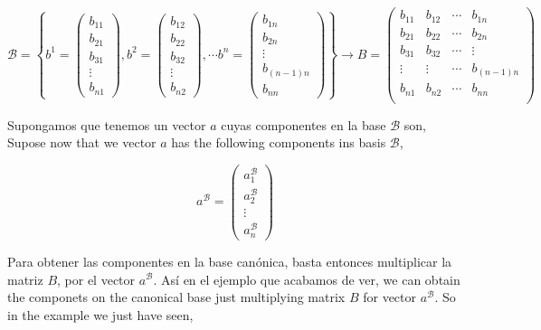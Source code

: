 \begin{equation*}
\mathcal{B}=\left\lbrace b^1=\begin{pmatrix}
b_{11}\\
b_{21}\\
b_{31}\\
\vdots \\
b_{n1}
\end{pmatrix},b^2=\begin{pmatrix}
b_{12}\\
b_{22}\\
b_{32}\\
\vdots \\
b_{n2}
\end{pmatrix},
\cdots
b^n=\begin{pmatrix}
b_{1n}\\
b_{2n}\\
\vdots \\
b_{(n-1)n}\\
b_{nn}
\end{pmatrix} \right\rbrace \rightarrow
B=\begin{pmatrix}
b_{11}&b_{12}& \cdots & b_{1n}\\
b_{21}&b_{22}& \cdots & b_{2n}\\
b_{31}&b_{32}& \cdots & \vdots \\
\vdots & \vdots & \cdots &  b_{(n-1)n}\\
b_{n1}&b_{n2}& \cdots & b_{nn}\\
\end{pmatrix}
\end{equation*}
\begin{paracol}{2}
Supongamos que tenemos un vector $a$ cuyas componentes en la base $\mathcal{B}$ son,
\switchcolumn
Supose now that we vector $a$ has the following components ins basis $\mathcal{B}$,
\end{paracol}

\begin{equation*}
a^{\mathcal{B}}=\begin{pmatrix}
a_1^{\mathcal{B}}\\
a_2^{\mathcal{B}}\\
\vdots \\
a_n^{\mathcal{B}}
\end{pmatrix}
\end{equation*}

\begin{paracol}{2}
Para obtener las componentes en la base canónica, basta entonces multiplicar la matriz $B$, por el vector $a^{\mathcal{B}}$. Así en el ejemplo que acabamos de ver,
\switchcolumn
we can obtain the componets on the canonical base just multiplying matrix $B$ for vector $a^{\mathcal{B}}$. So in the example we just have seen,
\end{paracol}

